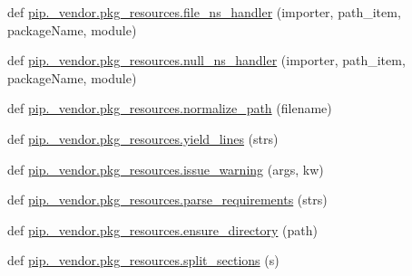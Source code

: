 \begin{DoxyCompactItemize}
\item 
def \hyperlink{namespacepip_1_1__vendor_1_1pkg__resources_ad9ea4af0c123ef5cdf9a04ee41307d49}{pip.\+\_\+vendor.\+pkg\+\_\+resources.\+file\+\_\+ns\+\_\+handler} (importer, path\+\_\+item, package\+Name, module)
\item 
def \hyperlink{namespacepip_1_1__vendor_1_1pkg__resources_ae56700a9a3eeed5e8101221d1bbaa7b3}{pip.\+\_\+vendor.\+pkg\+\_\+resources.\+null\+\_\+ns\+\_\+handler} (importer, path\+\_\+item, package\+Name, module)
\item 
def \hyperlink{namespacepip_1_1__vendor_1_1pkg__resources_aa9dddd90aef02ed75eb5e6f02feb8418}{pip.\+\_\+vendor.\+pkg\+\_\+resources.\+normalize\+\_\+path} (filename)
\item 
def \hyperlink{namespacepip_1_1__vendor_1_1pkg__resources_a9154cf7836eab6cbeb1238fdc578e0fd}{pip.\+\_\+vendor.\+pkg\+\_\+resources.\+yield\+\_\+lines} (strs)
\item 
def \hyperlink{namespacepip_1_1__vendor_1_1pkg__resources_ad9f0c6a743f176a2909c699e9b5b3747}{pip.\+\_\+vendor.\+pkg\+\_\+resources.\+issue\+\_\+warning} (args, kw)
\item 
def \hyperlink{namespacepip_1_1__vendor_1_1pkg__resources_acfa8d95bd782ff75e70ae61c11441bc8}{pip.\+\_\+vendor.\+pkg\+\_\+resources.\+parse\+\_\+requirements} (strs)
\item 
def \hyperlink{namespacepip_1_1__vendor_1_1pkg__resources_a41a609a1febb0a7e86c3dc55772f4169}{pip.\+\_\+vendor.\+pkg\+\_\+resources.\+ensure\+\_\+directory} (path)
\item 
def \hyperlink{namespacepip_1_1__vendor_1_1pkg__resources_a587a6806a8e8733d0114c374864c9143}{pip.\+\_\+vendor.\+pkg\+\_\+resources.\+split\+\_\+sections} (s)
\end{DoxyCompactItemize}
